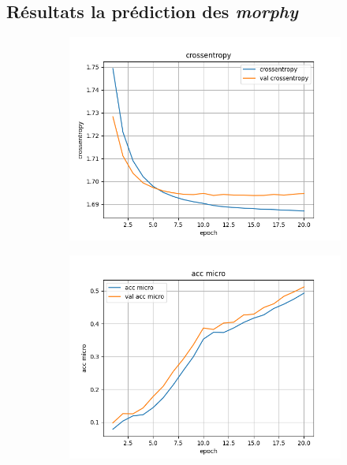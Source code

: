 \documentclass[a4paper]{article}
\begin{document}
\subsection{Résultats la prédiction des \textit{morphy}}

\begin{figure}[H]
    \centering
    \begin{subfigure}{0.32\textwidth}
        \centering
        \includegraphics[width=\linewidth]{../logs/supertag/crossentropy.png}
    \end{subfigure}
    \begin{subfigure}{0.32\textwidth}
        \centering
        \includegraphics[width=\linewidth]{../logs/supertag/acc micro.png}

\end{subfigure}
\end{figure}
\end{document}
